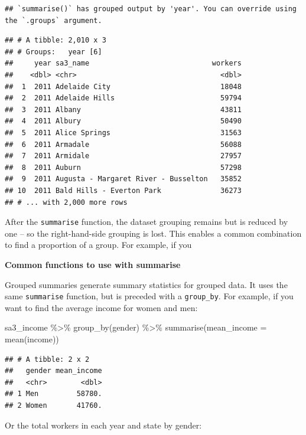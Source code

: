 \documentclass[
]{book}
\newenvironment{Shaded}{\begin{snugshade}}{\end{snugshade}}
\newcommand{\AttributeTok}[1]{\textcolor[rgb]{0.77,0.63,0.00}{#1}}
\newcommand{\FunctionTok}[1]{\textcolor[rgb]{0.00,0.00,0.00}{#1}}
\newcommand{\NormalTok}[1]{#1}
\newcommand{\SpecialCharTok}[1]{\textcolor[rgb]{0.00,0.00,0.00}{#1}}
\begin{document}
\begin{verbatim}
## `summarise()` has grouped output by 'year'. You can override using the `.groups` argument.
\end{verbatim}

\begin{verbatim}
## # A tibble: 2,010 x 3
## # Groups:   year [6]
##     year sa3_name                             workers
##    <dbl> <chr>                                  <dbl>
##  1  2011 Adelaide City                          18048
##  2  2011 Adelaide Hills                         59794
##  3  2011 Albany                                 43811
##  4  2011 Albury                                 50490
##  5  2011 Alice Springs                          31563
##  6  2011 Armadale                               56088
##  7  2011 Armidale                               27957
##  8  2011 Auburn                                 57298
##  9  2011 Augusta - Margaret River - Busselton   35852
## 10  2011 Bald Hills - Everton Park              36273
## # ... with 2,000 more rows
\end{verbatim}

After the \texttt{summarise} function, the dataset grouping remains but is reduced by one -- so the right-hand-side grouping is lost. This enables a common combination to find a proportion of a group. For example, if you

\textbf{Common functions to use with summarise}

Grouped summaries generate summary statistics for grouped data. It uses the same \texttt{summarise} function, but is preceded with a \texttt{group\_by}. For example, if you want to find the average income for women and men:

\begin{Shaded}
\begin{Highlighting}[]
\NormalTok{sa3\_income }\SpecialCharTok{\%\textgreater{}\%} 
  \FunctionTok{group\_by}\NormalTok{(gender) }\SpecialCharTok{\%\textgreater{}\%} 
  \FunctionTok{summarise}\NormalTok{(}\AttributeTok{mean\_income =} \FunctionTok{mean}\NormalTok{(income))}
\end{Highlighting}
\end{Shaded}

\begin{verbatim}
## # A tibble: 2 x 2
##   gender mean_income
##   <chr>        <dbl>
## 1 Men         58780.
## 2 Women       41760.
\end{verbatim}

Or the total workers in each year and state by gender:
\end{document}
